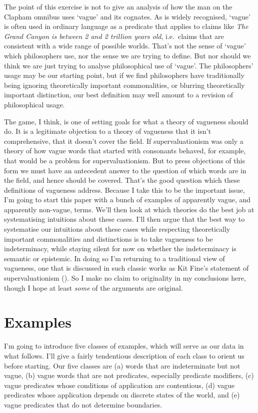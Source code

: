 \documentclass[
  11pt,
  letterpaper,
  DIV=11,
  numbers=noendperiod,
  twoside]{scrartcl}
\begin{document}
The point of this exercise is not to give an analysis of how the man on
the Clapham omnibus uses `vague' and its cognates. As is widely
recognised, `vague' is often used in ordinary language as a predicate
that applies to claims like \emph{The Grand Canyon is between 2 and 2
trillion years old}, i.e.~claims that are consistent with a wide range
of possible worlds. That's not the sense of `vague' which philosophers
use, nor the sense we are trying to define. But nor should we think we
are just trying to analyse philosophical use of `vague'. The
philosophers' usage may be our starting point, but if we find
philosophers have traditionally being ignoring theoretically important
commonalities, or blurring theoretically important distinction, our best
definition may well amount to a revision of philosophical usage.

The game, I think, is one of setting goals for what a theory of
vagueness should do. It is a legitimate objection to a theory of
vagueness that it isn't comprehensive, that it doesn't cover the field.
If supervaluationism was only a theory of how vague words that started
with consonants behaved, for example, that would be a problem for
supervaluationism. But to press objections of this form we must have an
antecedent answer to the question of which words are in the field, and
hence should be covered. That's the good question which these
definitions of vagueness address. Because I take this to be the
important issue, I'm going to start this paper with a bunch of examples
of apparently vague, and apparently non-vague, terms. We'll then look at
which theories do the best job at systematising intuitions about these
cases. I'll then argue that the best way to systematise our intuitions
about these cases while respecting theoretically important commonalities
and distinctions is to take vagueness to be indeterminacy, while staying
silent for now on whether the indeterminacy is semantic or epistemic. In
doing so I'm returning to a traditional view of vagueness, one that is
discussed in such classic works as Kit Fine's statement of
supervaluationism (). So I make no
claim to originality in my conclusions here, though I hope at least
\emph{some} of the arguments are original.

\section{Examples}\label{examples}

I'm going to introduce five classes of examples, which will serve as our
data in what follows. I'll give a fairly tendentious description of each
class to orient us before starting. Our five classes are (a) words that
are indeterminate but not vague, (b) vague words that are not
predicates, especially predicate modifiers, (c) vague predicates whose
conditions of application are contentious, (d) vague predicates whose
application depends on discrete states of the world, and (e) vague
predicates that do not determine boundaries.
\end{document}
